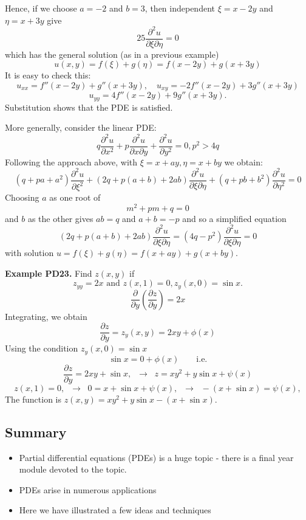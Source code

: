 \documentclass{article}
\newcommand{\pd}{\partial}
\begin{document}
Hence, if we choose $a = -2$ and $b = 3$, then independent $\xi=x-2y$ and $\eta=x+3y$ give
$$
25 \frac{\pd^2 u}{\pd \xi \pd \eta}= 0
$$
which has the general solution (as in a previous example) 
$$
u(x,y)=f(\xi) + g(\eta) = f( x - 2y)  +g(x +3 y)
$$
It is easy to check this:
$$
u_{xx} = f''(x-2y) + g''(x+3y), \quad
u_{xy} = -2 f''(x-2y) + 3 g''(x+3y)
$$
$$
u_{yy} = 4 f''(x-2y) + 9 g''(x+3y). 
$$
Substitution shows that the PDE is satisfied.



More generally, consider the linear PDE:
$$
q \frac{\partial^2 u}{\partial x^2} + p \frac{\partial^2 u}{\partial x \partial y} + \frac{\partial^2 u}{\partial y^2} =0, p^2 > 4q
$$
Following the approach above, with $\xi=x+ay, \eta=x+by$ we obtain:
{\small 
$$
\left( q + p a + a^2 \right) \frac{\pd^2 u}{\pd \xi^2} + \left( 2q + p (a + b) + 2ab \right) \frac{\pd^2
u}{\pd \xi \pd \eta} + \left( q + p b + b^2\right) \frac{\pd^2 u}{\pd \eta^2}= 0
$$
}
Choosing $a$ as one root of 
$$
m^2 + p m + q = 0
$$
and $b$ as the other gives $ab = q$ and $a+b = -p$ and so a simplified equation
$$
\left( 2q + p (a + b) + 2ab \right) \frac{\pd^2
u}{\pd \xi \pd \eta} = \left( 4q-p^2 \right)  \frac{\pd^2
u}{\pd \xi \pd \eta} = 0
$$
with solution $u = f(\xi) + g(\eta) = f(x+ay) + g(x+by)$.



\textbf{Example PD23.}  Find $z(x,y)$ if 
$$
z_{yy}=2x\mbox{   and    } z(x,1)=0, z_y(x,0)=\sin x.
$$
$$
\frac{\pd }{\pd y} \left( \frac{\pd z}{\pd y} \right) = 2x
$$
Integrating, we obtain
$$
 \frac{\partial z}{\partial y} =z_y(x,y)= 2xy+ \phi(x)
$$
Using the condition $ z_y(x,0)=\sin x$
$$
\sin x =0 + \phi(x)\quad\quad \mbox{i.e.}
$$
$$
 \frac{\partial z}{\partial y} = 2xy+ \sin x, \; \; \to \;\;
 z=xy^2 + y \sin x +\psi (x)
$$
$$
z(x,1)=0, \;\; \to \;\; 0 =x +  \sin x +\psi (x), \;\; \to \;\;
-(x +  \sin x ) =\psi (x),
$$
The function is $z(x,y)= xy^2 + y \sin x  -(x + \sin x )$.

\newpage

\subsection{Summary}

\begin{itemize}
\item
Partial differential equations (PDEs) is a huge topic - there is a final year module devoted to the topic.
\item
PDEs arise in numerous applications
\item
Here we have illustrated a few ideas and techniques
\end{itemize}
\end{document}
